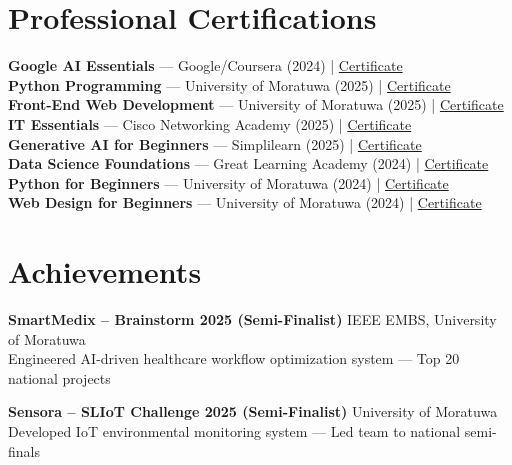 \documentclass[letterpaper,10.8pt]{article}
\begin{document}
\section{Professional Certifications}
\vspace{-1pt}

\textbf{Google AI Essentials} — Google/Coursera (2024) | \href{https://coursera.org/verify/specialization/JZOWGO7JRRHB}{Certificate}\\[3pt]
\textbf{Python Programming} — University of Moratuwa (2025) | \href{https://open.uom.lk/verify?code=VTmcj35vju}{Certificate}\\[3pt]
\textbf{Front-End Web Development} — University of Moratuwa (2025) | \href{https://open.uom.lk/verify?code=BHzCLZLb5G}{Certificate}\\[3pt]
\textbf{IT Essentials} — Cisco Networking Academy (2025) | \href{https://www.credly.com/badges/6111bbbe-db9e-438f-981d-c770b9fae03c}{Certificate}\\[3pt]
\textbf{Generative AI for Beginners} — Simplilearn (2025) | \href{https://www.linkedin.com/in/vindya-kodithuwakku-bb6187202/details/certifications/1760065621808/}{Certificate}\\[3pt]
\textbf{Data Science Foundations} — Great Learning Academy (2024) | \href{https://www.mygreatlearning.com/certificate/XGIRSIHP}{Certificate}\\[3pt]
\textbf{Python for Beginners} — University of Moratuwa (2024) | \href{https://open.uom.lk/verify?code=xw4fpfB8ZS}{Certificate}\\[3pt]
\textbf{Web Design for Beginners} — University of Moratuwa (2024) | \href{https://open.uom.lk/verify?code=kjyQ67aXNP}{Certificate}

\section{Achievements}
\vspace{-1pt}

\noindent\textbf{SmartMedix – Brainstorm 2025 (Semi-Finalist)} \hfill IEEE EMBS, University of Moratuwa\\
Engineered AI-driven healthcare workflow optimization system — Top 20 national projects

\vspace{5pt}
\noindent\textbf{Sensora – SLIoT Challenge 2025 (Semi-Finalist)} \hfill University of Moratuwa\\
Developed IoT environmental monitoring system — Led team to national semi-finals
\end{document}
